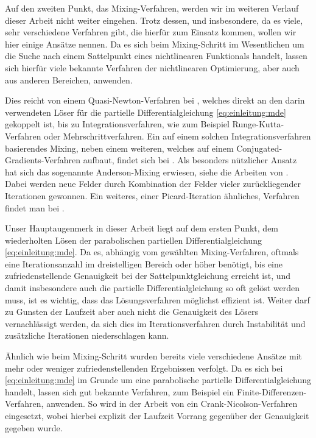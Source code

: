 Auf den zweiten Punkt, das Mixing-Verfahren, werden wir im weiteren Verlauf dieser Arbeit nicht weiter eingehen.
Trotz dessen, und insbesondere, da es viele, sehr verschiedene Verfahren gibt, die hierfür zum Einsatz kommen, wollen wir hier einige Ansätze nennen.
Da es sich beim Mixing-Schritt im Wesentlichen um die Suche nach einem Sattelpunkt eines nichtlinearen Funktionals handelt, lassen sich hierfür viele bekannte Verfahren der nichtlinearen Optimierung, aber auch aus anderen Bereichen, anwenden.

Dies reicht von einem Quasi-Newton-Verfahren bei \textcite{Matsen:1994bz}, welches direkt an den darin verwendeten Löser für die partielle Differentialgleichung \eqref{eq:einleitung:mde} gekoppelt ist, bis zu Integrationsverfahren, wie zum Beispiel Runge-Kutta-Verfahren oder Mehrschrittverfahren.
Ein auf einem solchen Integrationsverfahren basierendes Mixing, neben einem weiteren, welches auf einem Conjugated-Gradients-Verfahren aufbaut, findet sich bei \textcite{Ceniceros:2006is}.
Als besonders nützlicher Ansatz hat sich das sogenannte Anderson-Mixing erwiesen, siehe die Arbeiten von \textcite{Thompson:2004um,Stasiak:2011ba}.
Dabei werden neue Felder durch Kombination der Felder vieler zurückliegender Iterationen gewonnen.
Ein weiteres, einer Picard-Iteration ähnliches, Verfahren findet man bei \textcite{Drolet:1999bs}.

Unser Hauptaugenmerk in dieser Arbeit liegt auf dem ersten Punkt, dem wiederholten Lösen der parabolischen partiellen Differentialgleichung \eqref{eq:einleitung:mde}.
Da es, abhängig vom gewählten Mixing-Verfahren, oftmals eine Iterationsanzahl im dreistelligen Bereich oder höher benötigt, bis eine zufriedenstellende Genauigkeit bei der Sattelpunktgleichung erreicht ist, und damit insbesondere auch die partielle Differentialgleichung so oft gelöst werden muss, ist es wichtig, dass das Lösungsverfahren möglichst effizient ist.
Weiter darf zu Gunsten der Laufzeit aber auch nicht die Genauigkeit des Lösers vernachlässigt werden, da sich dies im Iterationsverfahren durch Instabilität und zusätzliche Iterationen niederschlagen kann.

Ähnlich wie beim Mixing-Schritt wurden bereits viele verschiedene Ansätze mit mehr oder weniger zufriedenstellenden Ergebnissen verfolgt.
Da es sich bei \eqref{eq:einleitung:mde} im Grunde um eine parabolische partielle Differentialgleichung handelt, lassen sich gut bekannte Verfahren, zum Beispiel ein Finite-Differenzen-Verfahren, anwenden.
So wird in der Arbeit von \textcite{Drolet:1999bs} ein Crank-Nicolson-Verfahren eingesetzt, wobei hierbei explizit der Laufzeit Vorrang gegenüber der Genauigkeit gegeben wurde.

